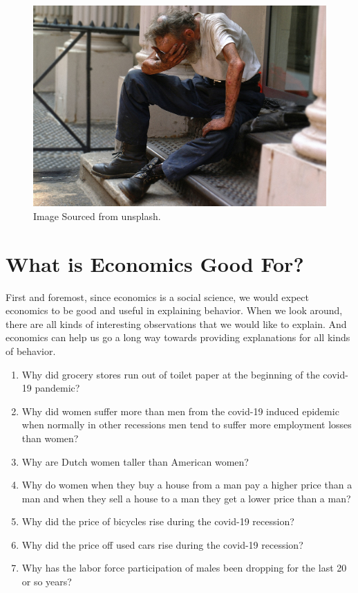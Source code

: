 \documentclass[
]{book}
\providecommand{\tightlist}{%
  \setlength{\itemsep}{0pt}\setlength{\parskip}{0pt}}
\begin{document}
\begin{figure}

{\centering \includegraphics[width=0.5\linewidth]{img/ch0/fig7} 

}

\caption{Image Sourced from unsplash.}\label{fig:fig007}
\end{figure}

\hypertarget{what-is-economics-good-for}{%
\section{What is Economics Good For?}\label{what-is-economics-good-for}}

First and foremost, since economics is a social science, we would expect economics to be good and useful in explaining behavior. When we look around, there are all kinds of interesting observations that we would like to explain. And economics can help us go a long way towards providing explanations for all kinds of behavior.

\begin{enumerate}
\def\labelenumi{\arabic{enumi}.}
\tightlist
\item
  Why did grocery stores run out of toilet paper at the beginning of the covid-19 pandemic?
\item
  Why did women suffer more than men from the covid-19 induced epidemic when normally in other recessions men tend to suffer more employment losses than women?\\
\item
  Why are Dutch women taller than American women?
\item
  Why do women when they buy a house from a man pay a higher price than a man and when they sell a house to a man they get a lower price than a man?
\item
  Why did the price of bicycles rise during the covid-19 recession?
\item
  Why did the price off used cars rise during the covid-19 recession?
\item
  Why has the labor force participation of males been dropping for the last 20 or so years?
\end{enumerate}
\end{document}
